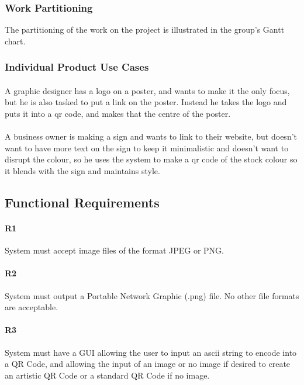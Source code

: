 \documentclass[12pt, titlepage]{article}
\begin{document}
\subsubsection{Work Partitioning}

	The partitioning of the work on the project is illustrated in the group's 
	Gantt chart.

\subsubsection{Individual Product Use Cases}

	\paragraph{}
	A graphic designer has a logo on a poster, and wants to make it the only 
	focus, but he is also tasked to put a link on the poster. Instead he takes 
	the logo and puts it into a qr code, and makes that the centre of the 
	poster.
	\paragraph{}
	 A business owner is making a sign and wants to link to their website, but 
	 doesn't want to have more text on the sign to keep it minimalistic and 
	 doesn't want to disrupt the colour, so he uses the system to make a qr 
	 code of the stock colour so it blends with the sign and maintains style.
	

\subsection{Functional Requirements}

	\paragraph{R1}
	System must accept image files of the format JPEG or PNG.
	\paragraph{R2}
	System must output a Portable Network Graphic (.png) file. No other file 
	formats are acceptable. 
	\paragraph{R3}
	System must have a GUI allowing the user to input an ascii string to 
	encode into a QR Code, and allowing the input of an image or no image if 
	desired to create an artistic QR Code or a standard QR Code if no image.
\end{document}
